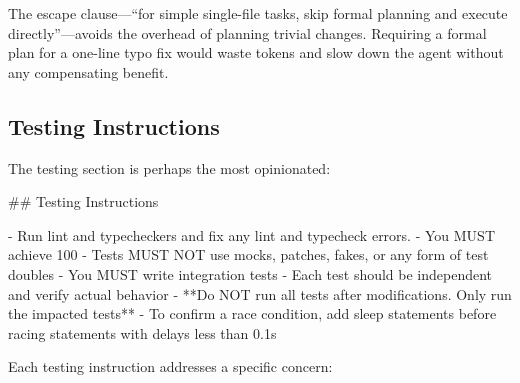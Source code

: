 \documentclass{article}
\begin{document}
\noindent The escape clause---``for simple single-file tasks, skip
formal planning and execute directly''---avoids the overhead of
planning trivial changes.  Requiring a formal plan for a one-line typo
fix would waste tokens and slow down the agent without any
compensating benefit.

\subsection{Testing Instructions}

The testing section is perhaps the most opinionated:

\begin{prompt}
## Testing Instructions

- Run lint and typecheckers and fix any lint and typecheck
  errors.
- You MUST achieve 100%
- Tests MUST NOT use mocks, patches, fakes, or any form of
  test doubles
- You MUST write integration tests
- Each test should be independent and verify actual behavior
- **Do NOT run all tests after modifications. Only run the
  impacted tests**
- To confirm a race condition, add sleep statements before
  racing statements with delays less than 0.1s
\end{prompt}

\noindent Each testing instruction addresses a specific concern:
\end{document}
